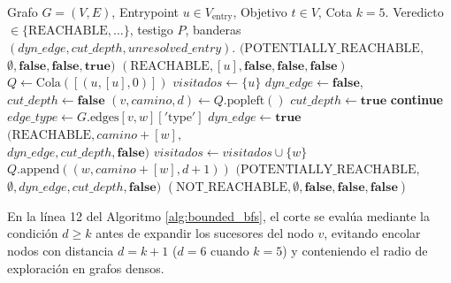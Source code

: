 \documentclass[conference]{IEEEtran}
\begin{document}
\begin{algorithm}[t]
\caption{Búsqueda Acotada de Alcanzabilidad (\textit{Bounded BFS})}
\label{alg:bounded_bfs}
\begin{algorithmic}[1]
\REQUIRE Grafo $G=(V, E)$, Entrypoint $u \in V_{\text{entry}}$, Objetivo $t \in V$, Cota $k=5$.
\ENSURE Veredicto $\in \{\text{REACHABLE}, \dots\}$, testigo $P$, banderas $(\mathit{dyn\_edge}, \mathit{cut\_depth}, \mathit{unresolved\_entry})$.
    \RETURN $(\text{POTENTIALLY\_REACHABLE},$ \\ \hspace*{2.2em} $\emptyset, \mathbf{false}, \mathbf{false}, \mathbf{true})$
\ENDIF
{}
    \RETURN $(\text{REACHABLE}, [u], \mathbf{false}, \mathbf{false}, \mathbf{false})$
\ENDIF
\STATE $Q \leftarrow \text{Cola}([ (u, [u], 0) ])$
\STATE $\mathit{visitados} \leftarrow \{u\}$
\STATE $\mathit{dyn\_edge} \leftarrow \mathbf{false}$, $\mathit{cut\_depth} \leftarrow \mathbf{false}$
    \STATE $(v, \mathit{camino}, d) \leftarrow Q.\text{popleft}()$
            \STATE $\mathit{cut\_depth} \leftarrow \mathbf{true}$
        \ENDIF
        \STATE \textbf{continue}
    \ENDIF
        \STATE $\mathit{edge\_type} \leftarrow G.\text{edges}[v, w]['\text{type}']$
            \STATE $\mathit{dyn\_edge} \leftarrow \mathbf{true}$
        \ENDIF
            \RETURN $(\text{REACHABLE}, \mathit{camino} + [w],$ \\ \hspace*{4.2em} $\mathit{dyn\_edge}, \mathit{cut\_depth}, \mathbf{false})$
        \ENDIF
            \STATE $\mathit{visitados} \leftarrow \mathit{visitados} \cup \{w\}$
            \STATE $Q.\text{append}((w, \mathit{camino} + [w], d+1))$
        \ENDIF
    \ENDFOR
\ENDWHILE
{}
    \RETURN $(\text{POTENTIALLY\_REACHABLE},$ \\ \hspace*{2.2em} $\emptyset, \mathit{dyn\_edge}, \mathit{cut\_depth}, \mathbf{false})$
\ELSE
    \RETURN $(\text{NOT\_REACHABLE}, \emptyset, \mathbf{false}, \mathbf{false}, \mathbf{false})$
\ENDIF
\end{algorithmic}
\end{algorithm}

En la línea 12 del Algoritmo \ref{alg:bounded_bfs}, el corte se evalúa mediante la condición $d \ge k$ antes de expandir los sucesores del nodo $v$, evitando encolar nodos con distancia $d=k+1$ ($d=6$ cuando $k=5$) y conteniendo el radio de exploración en grafos densos.
\end{document}
